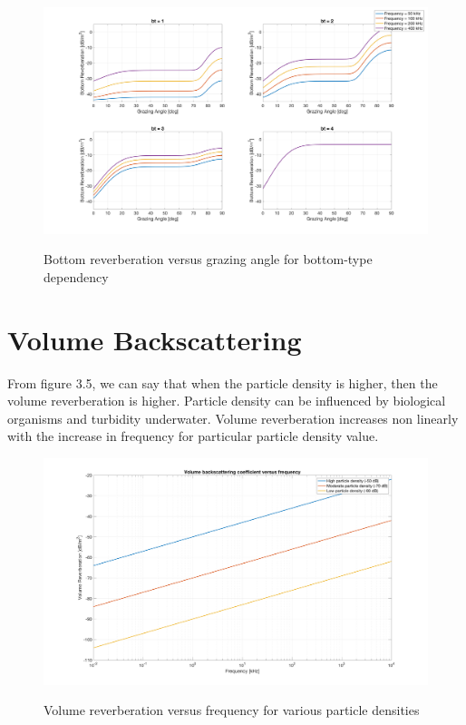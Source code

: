 \begin{figure}[H]
\centering
{\includegraphics[scale=0.18]{usp3_4.png}}
\caption{Bottom reverberation versus grazing angle for bottom-type dependency}
\end{figure}

\newpage

\section{ Volume Backscattering } \label{ Volume Backscattering } 
\noindent From figure 3.5, we can say that when the particle density is higher, then the volume reverberation is higher. Particle density can be influenced by biological organisms and turbidity underwater. Volume reverberation increases non linearly with the increase in frequency for particular particle density value. 

\begin{figure}[H]
\centering
{\includegraphics[scale=0.18]{usp3_5.png}}
\caption{Volume reverberation versus frequency for various particle densities}
\end{figure}



